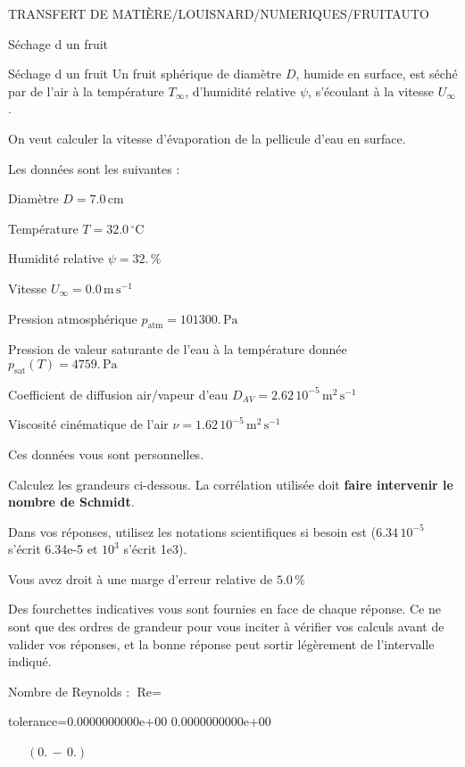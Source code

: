 \documentclass[12pt]{article}
\begin{document}
\begin{quiz}{TRANSFERT DE MATIÈRE/LOUISNARD/NUMERIQUES/FRUITAUTO}
\begin{cloze}{Séchage d un fruit}
\end{cloze} 


 \begin{cloze}{Séchage d un fruit} 
Un fruit sphérique de diamètre $D$, humide en surface, est séché par de l'air à la température $T_\infty$, d'humidité relative $\psi$, s'écoulant à la vitesse $U_\infty$.

On veut calculer la vitesse d'évaporation de la pellicule d'eau en surface.

 

Les données sont les suivantes :

 

Diamètre $D = 7.0\,  \mathrm{cm} $

Température $T = 32.0\,  \mathrm{^\circ\mathrm{C}} $

Humidité relative $\psi = 32.\, \% $

Vitesse $U_\infty = 0.0\,  \mathrm{m}\,  \mathrm{s}^{-1} $

Pression atmosphérique $p_{\text{atm}} = 101300.\,  \mathrm{Pa} $

Pression de valeur saturante de l’eau à la température donnée $p_{\text{sat}}(T) = 4759.\,  \mathrm{Pa} $

Coefficient de diffusion air/vapeur d’eau $D_{AV} =  2.62 \, 10^{-5} \,  \mathrm{m}^{2}\,  \mathrm{s}^{-1} $

Viscosité cinématique de l’air $\nu =  1.62 \, 10^{-5} \,  \mathrm{m}^{2}\,  \mathrm{s}^{-1} $

Ces données vous sont personnelles.

 

Calculez les grandeurs ci-dessous. La corrélation utilisée doit \textbf{faire intervenir le nombre de Schmidt}.

Dans vos réponses, utilisez les notations scientifiques si besoin est ($6.34\, 10^{-5}$ s'écrit 6.34e-5 et $10^{3}$ s'écrit 1e3).

Vous avez droit à une marge d'erreur relative de $5.0\, \% $

Des fourchettes indicatives vous sont fournies en face de chaque réponse. Ce ne sont que des ordres de grandeur pour vous inciter à vérifier vos calculs avant de valider vos réponses, et la bonne réponse peut sortir légèrement de l'intervalle indiqué.

 

Nombre de Reynolds : $\text{Re} =  $
\begin{numerical}[points=1] 
\item[tolerance={0.0000000000e+00}] 0.0000000000e+00 
\end{numerical} 
 $\,$ 
 $ \quad (0. \, - \, 0.) $ 


\end{cloze}
\end{quiz}
\end{document}
